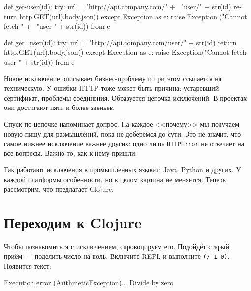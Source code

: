 \ifx\devicetype\mobile

\begin{english}
  \begin{python}
def get-user(id):
  try:
    url = "http://api.company.com/" + \
          "user/" + str(id)
    return http.GET(url).body.json()
  except Exception as e:
    raise Exception ("Cannot fetch " + \
          "user " + str(id)) from e
  \end{python}
\end{english}

\else

\begin{english}
  \begin{js}
def get_user(id):
  try:
    url = "http://api.company.com/user/" + str(id)
    return http.GET(url).body.json()
  except Exception as e:
    raise Exception("Cannot fetch user " + str(id)) from e

  \end{js}
\end{english}

\fi


Новое исключение описывает бизнес-проб\-ле\-му и при этом ссылается на
техническую. У ошибки HTTP тоже может быть причина: устаревший сертификат,
проблемы соединения. Образуется цепочка исключений. В проектах они достигают
пяти и более звеньев.

Спуск по цепочке напоминает допрос. На каждое <<почему>> мы получаем новую пищу
для размышлений, пока не доберёмся до сути. Это не значит, что самое нижнее
исключение важнее других: одно лишь \verb|HTTPError| не отвечает на все
вопросы. Важно то, как к нему пришли.

Так работают исключения в промышленных языках: Java, Python и других. У каждой
платформы особенности, но в целом картина не меняется. Теперь рассмотрим, что
предлагает Clojure.

\section{Переходим к Clojure}

Чтобы познакомиться с исключением, спровоцируем его. Подойдёт старый
приём~--- поделить число на ноль. Включите REPL и выполните
\verb|(/ 1 0)|. Появится текст:


\begin{english}
  \begin{text}
Execution error (ArithmeticException)...
Divide by zero
  \end{text}
\end{english}

